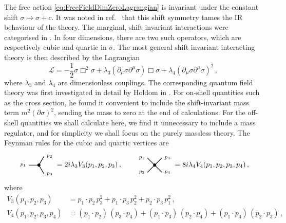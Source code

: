 \documentclass[a4paper,11pt]{article}
\def\sdot{\!\cdot\!}
\begin{document}
The free action \eqref{eq:FreeFieldDimZeroLagrangian} is invariant under the constant shift $\sigma \mapsto \sigma + c$. It was noted in ref.~\cite{Tseytlin:2022flu} that this shift symmetry tames the IR behaviour of the theory. The marginal, shift invariant interactions were categorised in \cite{Safari:2021ocb}. In four dimensions, there are two such operators, which are respectively cubic and quartic in $\sigma$. The most general shift invariant interacting theory is then described by the Lagrangian
\begin{equation}\label{eq:LagArbCoupl}
    \mathcal{L} = - \frac12 \sigma\Box^2 \sigma + \lambda_3 (\partial_\mu \sigma \partial^\mu \sigma)\Box \sigma + \lambda_4 (\partial_\mu \sigma \partial^\mu \sigma)^2 \,,
\end{equation}
where $\lambda_3$ and $\lambda_4$ are dimensionless couplings. The corresponding quantum field theory was first investigated in detail by Holdom in \cite{Holdom:2023usn,Holdom:2024cfq}. For on-shell quantities such as the cross section, he found it convenient to include the shift-invariant mass term $m^2(\partial\sigma)^2$, sending the mass to zero at the end of calculations. For the off-shell quantities we shall calculate here, we find it unnecessary to include a mass regulator, and for simplicity we shall focus on the purely massless theory. The Feynman rules for the cubic and quartic vertices are 
\begin{align}
    \begin{tikzpicture}[baseline={([yshift=-0.5ex]current bounding box.center)}]
    \draw[thick] (0,0)--(-0.5,0) node[left] {${\scriptstyle {p_1}}$};
    \draw[thick] (0,0)--(60:0.5) node[right] {${\scriptstyle {p_2}}$};
    \draw[thick] (0,0)--(-60:0.5) node[right] {${\scriptstyle {p_3}}$};
    \filldraw (0,0) circle (2pt);
    \end{tikzpicture}
    = 2i\lambda_3 V_3(p_1,p_2,p_3)\, ,
    \qquad
    \begin{tikzpicture}[baseline={([yshift=-0.5ex]current bounding box.center)}]
    \draw[thick] (0,0)--(-135:0.5) node[left]{${\scriptstyle {p_2}}$};
    \draw[thick] (0,0)--(135:0.5) node[left]{${\scriptstyle {p_1}}$};
    \draw[thick] (0,0)--(45:0.5) node[right]{${\scriptstyle {p_3}}$};
    \draw[thick] (0,0)--(-45:0.5) node[right]{${\scriptstyle {p_4}}$};
    \filldraw (0,0) circle (2pt);
    \end{tikzpicture}
    = 8i\lambda_4 V_4(p_1,p_2,p_3,p_4) \,,
\end{align}
where
\begin{align}
    V_3(p_1,p_2,p_3) &= p_1\sdot p_2\, p_3^2 + p_1\sdot p_3\, p_2^2 + p_2\sdot p_3\, p_1^2\,,
    \\
    V_4(p_1,p_2,p_3,p_4) &= (p_1 \sdot p_2 )\,(p_3 \sdot p_4) + (p_1 \sdot p_3) \, (p_2 \sdot p_4) + (p_1 \sdot p_4 ) \, ( p_2 \sdot p_3) \,,\label{eq:V4}
\end{align}
\end{document}
